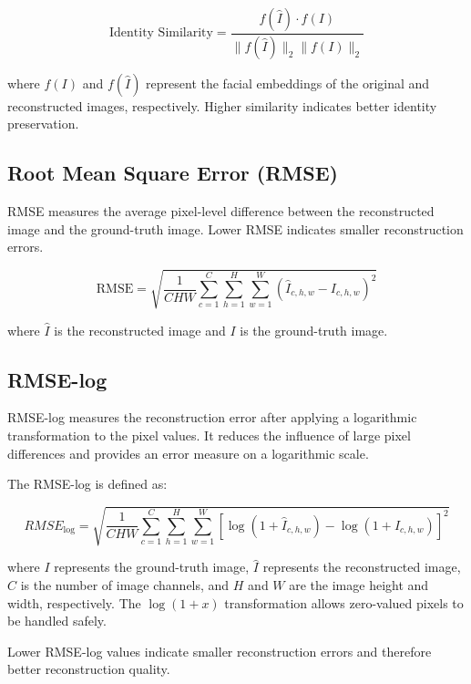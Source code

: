 \begin{equation}
\text{Identity Similarity} =
\frac{f(\hat{I}) \cdot f(I)}
{\|f(\hat{I})\|_2 \|f(I)\|_2}
\end{equation}

\noindent where $f(I)$ and $f(\hat{I})$ represent the facial embeddings of the original and reconstructed images, respectively. Higher similarity indicates better identity preservation.

\subsection{Root Mean Square Error (RMSE)}

RMSE measures the average pixel-level difference between the reconstructed image and the ground-truth image. Lower RMSE indicates smaller reconstruction errors.

\begin{equation}
\text{RMSE} =
\sqrt{
\frac{1}{CHW}
\sum_{c=1}^{C}
\sum_{h=1}^{H}
\sum_{w=1}^{W}
\left(\hat{I}_{c,h,w}-I_{c,h,w}\right)^2
}
\end{equation}

\noindent where $\hat{I}$ is the reconstructed image and $I$ is the ground-truth image.

\subsection{RMSE-log}

RMSE-log measures the reconstruction error after applying a logarithmic
transformation to the pixel values. It reduces the influence of large
pixel differences and provides an error measure on a logarithmic scale.

\noindent The RMSE-log is defined as:

\label{sec:rmse-log}
\begin{equation}
RMSE_{\log} =
\sqrt{
\frac{1}{CHW}
\sum_{c=1}^{C}
\sum_{h=1}^{H}
\sum_{w=1}^{W}
\left[
\log(1+\hat{I}_{c,h,w})
-
\log(1+I_{c,h,w})
\right]^2
}
\label{eq:rmse-log}
\end{equation}

\noindent where $I$ represents the ground-truth image, $\hat{I}$ represents the
reconstructed image, $C$ is the number of image channels, and $H$ and
$W$ are the image height and width, respectively. The $\log(1+x)$
transformation allows zero-valued pixels to be handled safely.

\noindent Lower RMSE-log values indicate smaller reconstruction errors and
therefore better reconstruction quality.
 
